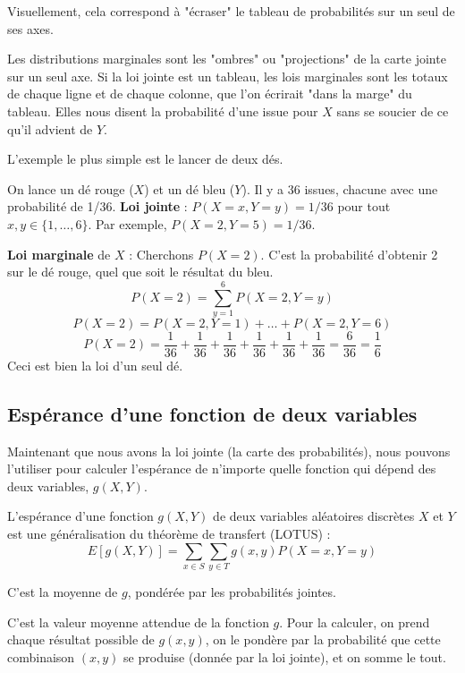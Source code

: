 Visuellement, cela correspond à "écraser" le tableau de probabilités sur un seul de ses axes.

\begin{intuitionbox}
Les distributions marginales sont les "ombres" ou "projections" de la carte jointe sur un seul axe. Si la loi jointe est un tableau, les lois marginales sont les totaux de chaque ligne et de chaque colonne, que l'on écrirait "dans la marge" du tableau. Elles nous disent la probabilité d'une issue pour $X$ sans se soucier de ce qu'il advient de $Y$.
\end{intuitionbox}

L'exemple le plus simple est le lancer de deux dés.

\begin{examplebox}
On lance un dé rouge ($X$) et un dé bleu ($Y$). Il y a 36 issues, chacune avec une probabilité de 1/36.
\textbf{Loi jointe} : $P(X=x, Y=y) = 1/36$ pour tout $x, y \in \{1, \dots, 6\}$.
Par exemple, $P(X=2, Y=5) = 1/36$.

\textbf{Loi marginale} de $X$ : Cherchons $P(X=2)$. C'est la probabilité d'obtenir 2 sur le dé rouge, quel que soit le résultat du bleu.
$$P(X=2) = \sum_{y=1}^6 P(X=2, Y=y)$$
$$P(X=2) = P(X=2,Y=1) + \dots + P(X=2,Y=6)$$
$$P(X=2) = \frac{1}{36} + \frac{1}{36} + \frac{1}{36} + \frac{1}{36} + \frac{1}{36} + \frac{1}{36} = \frac{6}{36} = \frac{1}{6}$$
Ceci est bien la loi d'un seul dé.
\end{examplebox}

\subsection{Espérance d'une fonction de deux variables}

Maintenant que nous avons la loi jointe (la carte des probabilités), nous pouvons l'utiliser pour calculer l'espérance de n'importe quelle fonction qui dépend des deux variables, $g(X,Y)$.

\begin{definitionbox}
L'espérance d'une fonction $g(X,Y)$ de deux variables aléatoires discrètes $X$ et $Y$ est une généralisation du théorème de transfert (LOTUS) :
$$E[g(X,Y)] = \sum_{x \in S} \sum_{y \in T} g(x,y) P(X=x, Y=y)$$
\end{definitionbox}

C'est la moyenne de $g$, pondérée par les probabilités jointes.

\begin{intuitionbox}
C'est la valeur moyenne attendue de la fonction $g$. Pour la calculer, on prend chaque résultat possible de $g(x,y)$, on le pondère par la probabilité que cette combinaison $(x,y)$ se produise (donnée par la loi jointe), et on somme le tout.
\end{intuitionbox}

